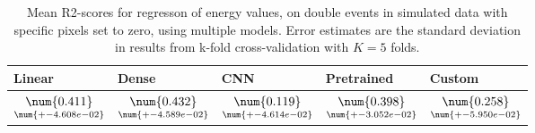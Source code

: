 \begin{table}
\centering
\caption{
Mean R2-scores for regresson of energy values, on double events in simulated data with specific pixels
set to zero, using multiple models. Error estimates are the standard deviation in results from k-fold 
cross-validation with $K=5$ folds.
}
\label{tab:regression-simulated-double-energy-pixelmod-r2}
\begin{tabular}{lllll}
\toprule
                                             Linear &                                               Dense &                                                 CNN &                                          Pretrained &                                              Custom \\
\midrule
 $\underset{\num{+- 4.608e-02 }  }{\num{ 0.411 } }$ &  $\underset{\num{+- 4.589e-02 }  }{\num{ 0.432 } }$ &  $\underset{\num{+- 4.614e-02 }  }{\num{ 0.119 } }$ &  $\underset{\num{+- 3.052e-02 }  }{\num{ 0.398 } }$ &  $\underset{\num{+- 5.950e-02 }  }{\num{ 0.258 } }$ \\
\bottomrule
\end{tabular}
\end{table}

